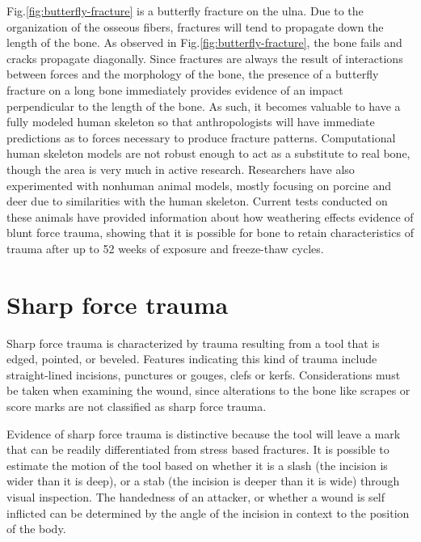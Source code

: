 \documentclass[titlepage]{article}
\begin{document}
Fig.\ref{fig:butterfly-fracture} is a butterfly fracture on the ulna. Due to the organization of the osseous fibers, fractures will tend to propagate down the length of the bone.\cite{mechanics} As observed in Fig.\ref{fig:butterfly-fracture}, the bone fails and cracks propagate diagonally. Since fractures are always the result of interactions between forces and the morphology of the bone, the presence of a butterfly fracture on a long bone immediately provides evidence of an impact perpendicular to the length of the bone. As such, it becomes valuable to have a fully modeled human skeleton so that anthropologists will have immediate predictions as to forces necessary to produce fracture patterns. Computational human skeleton models are not robust enough to act as a substitute to real bone, though the area is very much in active research. Researchers have also experimented with nonhuman animal models, mostly focusing on porcine and deer due to similarities with the human skeleton. Current tests conducted on these animals have provided information about how weathering effects evidence of blunt force trauma, showing that it is possible for bone to retain characteristics of trauma after up to 52 weeks of exposure and freeze-thaw cycles.\cite{bft}

\section{Sharp force trauma}
Sharp force trauma is characterized by trauma resulting from a tool that is edged, pointed, or beveled. Features indicating this kind of trauma include straight-lined incisions, punctures or gouges, clefs or kerfs. Considerations must be taken when examining the wound, since alterations to the bone like scrapes or score marks are not classified as sharp force trauma. \cite{trauma}

Evidence of sharp force trauma is distinctive because the tool will leave a mark that can be readily differentiated from stress based fractures. It is possible to estimate the motion of the tool based on whether it is a slash (the incision is wider than it is deep), or a stab (the incision is deeper than it is wide) through visual inspection. \cite{serrated} The handedness of an attacker, or whether a wound is self inflicted can be determined by the angle of the incision in context to the position of the body.
\end{document}
